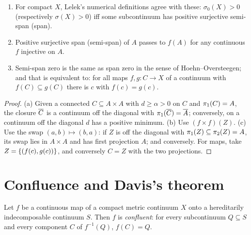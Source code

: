 
\begin{proposition}\label{prop:span-basic}
\leavevmode
\begin{enumerate}[label=(\alph*)]
\item For compact $X$, Lelek's numerical definitions agree with these: $\sigma_0(X)>0$ (respectively $\sigma(X)>0$) iff some subcontinuum has
positive surjective semi-span (span).
\item Positive surjective span (semi-span) of $A$ passes to $f(A)$ for any continuous $f$ injective on $A$.
\item Semi-span zero is the same as span zero in the sense of Hoehn--Oversteegen; and that is equivalent to: for all maps $f,g\colon C\to X$
of a continuum with $f(C)\subseteq g(C)$ there is $c$ with $f(c)=g(c)$.
\end{enumerate}
\end{proposition}

\begin{proof}
(a) Given a connected $C\subseteq A\times A$ with $d\ge\alpha>0$ on $C$ and $\pi_{1}(C)=A$, the closure $\overline{C}$ is a continuum off the diagonal with
$\pi_{1}(\overline{C})=\overline{A}$; conversely, on a continuum off the diagonal $d$ has a positive minimum. (b) Use $(f\times f)(Z)$. (c) Use the swap
$(a,b)\mapsto(b,a)$: if $Z$ is off the diagonal with $\pi_{1}(Z)\subseteq\pi_{2}(Z)=A$, its swap lies in $A\times A$ and has first projection $A$; and
conversely. For maps, take $Z=\left\{ (f(c),g(c)) \right\}$, and conversely $C=Z$ with the two projections.
\end{proof}


\section{Confluence and Davis's theorem}

\begin{theorem}\label{thm:cook}
Let $f$ be a continuous map of a compact metric continuum $X$ onto a hereditarily indecomposable continuum $S$. Then $f$ is
\emph{confluent}: for every subcontinuum $Q\subseteq S$ and every component $C$ of $f^{-1}(Q)$, $f(C)=Q$.
\end{theorem}

